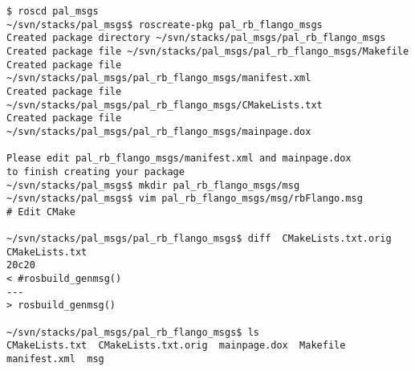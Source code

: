 \begin{lstlisting}[caption=Flango files layout, label=impl-ros-create-message]
$ roscd pal_msgs
~/svn/stacks/pal_msgs$ roscreate-pkg pal_rb_flango_msgs
Created package directory ~/svn/stacks/pal_msgs/pal_rb_flango_msgs
Created package file ~/svn/stacks/pal_msgs/pal_rb_flango_msgs/Makefile
Created package file ~/svn/stacks/pal_msgs/pal_rb_flango_msgs/manifest.xml
Created package file ~/svn/stacks/pal_msgs/pal_rb_flango_msgs/CMakeLists.txt
Created package file ~/svn/stacks/pal_msgs/pal_rb_flango_msgs/mainpage.dox

Please edit pal_rb_flango_msgs/manifest.xml and mainpage.dox 
to finish creating your package
~/svn/stacks/pal_msgs$ mkdir pal_rb_flango_msgs/msg
~/svn/stacks/pal_msgs$ vim pal_rb_flango_msgs/msg/rbFlango.msg
# Edit CMake

~/svn/stacks/pal_msgs/pal_rb_flango_msgs$ diff  CMakeLists.txt.orig CMakeLists.txt
20c20
< #rosbuild_genmsg()
---
> rosbuild_genmsg()

~/svn/stacks/pal_msgs/pal_rb_flango_msgs$ ls
CMakeLists.txt  CMakeLists.txt.orig  mainpage.dox  Makefile  manifest.xml  msg


\end{lstlisting}
